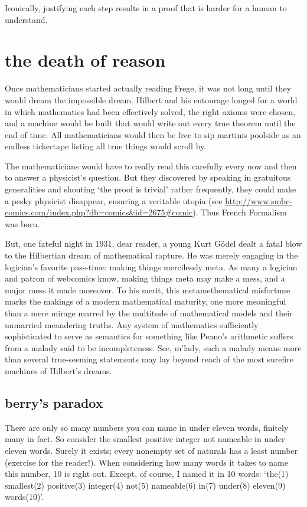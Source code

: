 \message{ !name(truth.tex)}\documentclass{scrbook}
\begin{document}
Ironically, justifying each step results in a proof that is harder for a human to understand. 
\section[The Death of Reason]{the death of reason}
Once mathematicians started actually reading Frege, it was not long until they would dream the impossible dream. Hilbert and his entourage longed for a world in which mathematics had been effectively solved, the right axioms were chosen, and a machine would be built that would write out every true theorem until the end of time. All mathematicians would then be free to sip martinis poolside as an endless tickertape listing all true things would scroll by. \cite{wiki:hilbert-prog}

The mathematicians would have to really read this carefully every now and then to answer a physicist's question. But they discovered by speaking in gratuitous generalities and shouting `the proof is trivial' rather frequently, they could make a pesky physicist disappear, ensuring a veritable utopia (see \url{http://www.smbc-comics.com/index.php?db=comics&id=2675#comic}). Thus French Formalism was born.  

But, one fateful night in 1931, dear reader, a young Kurt Gödel dealt a fatal blow to the Hilbertian dream of mathematical rapture. He was merely engaging in the logician's favorite pass-time: making things mercilessly meta. As many a logician and patron of webcomics know, making things meta may make a mess, and a major mess it made moreover. To his merit, this metamethematical misfortune marks the makings of a modern mathematical maturity, one more meaningful than a mere mirage marred by the multitude of mathematical models and their unmarried meandering truths. Any system of mathematics sufficiently sophisticated to serve as semantics for something like Peano's arithmetic suffers from a malady said to be incompleteness. See, m'lady, such a malady means more than several true-seeming statements may lay beyond reach of the most surefire machines of Hilbert's dreams.

\subsection[Berry's paradox]{berry's paradox}
There are only so many numbers you can name in under eleven words, finitely many in fact. So consider the smallest positive integer not nameable in under eleven words. Surely it exists; every nonempty set of naturals has a least number (exercise for the reader!). When considering how many words it takes to name this number, 10 is right out. Except, of course, I named it in 10 words: `the(1) smallest(2) positive(3) integer(4) not(5) nameable(6) in(7) under(8) eleven(9) words(10)'.  
\end{document}
